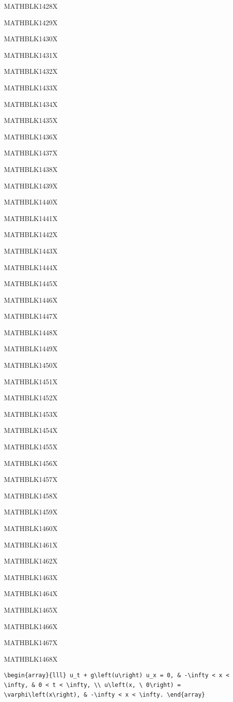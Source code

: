 \documentclass[
  ukrainian,
]{article}
\begin{document}
MATHBLK1428X

MATHBLK1429X

MATHBLK1430X

MATHBLK1431X

MATHBLK1432X

MATHBLK1433X

MATHBLK1434X

MATHBLK1435X

MATHBLK1436X

MATHBLK1437X

MATHBLK1438X

MATHBLK1439X

MATHBLK1440X

MATHBLK1441X

MATHBLK1442X

MATHBLK1443X

MATHBLK1444X

MATHBLK1445X

MATHBLK1446X

MATHBLK1447X

MATHBLK1448X

MATHBLK1449X

MATHBLK1450X

MATHBLK1451X

MATHBLK1452X

MATHBLK1453X

MATHBLK1454X

MATHBLK1455X

MATHBLK1456X

MATHBLK1457X

MATHBLK1458X

MATHBLK1459X

MATHBLK1460X

MATHBLK1461X

MATHBLK1462X

MATHBLK1463X

MATHBLK1464X

MATHBLK1465X

MATHBLK1466X

MATHBLK1467X

MATHBLK1468X

\begin{verbatim}
\begin{array}{lll} u_t + g\left(u\right) u_x = 0, & -\infty < x < \infty, & 0 < t < \infty, \\ u\left(x, \ 0\right) = \varphi\left(x\right), & -\infty < x < \infty. \end{array}
\end{verbatim}
\end{document}

